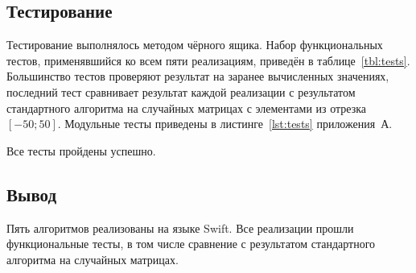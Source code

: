 \subsection{Тестирование}
Тестирование выполнялось методом чёрного ящика. Набор функциональных тестов, применявшийся ко всем пяти реализациям, приведён в таблице~\ref{tbl:tests}. Большинство тестов проверяют результат на заранее вычисленных значениях, последний тест сравнивает результат каждой реализации с результатом стандартного алгоритма на случайных матрицах с элементами из отрезка $[-50; 50]$. Модульные тесты приведены в листинге~\ref{lst:tests} приложения~А.

Все тесты пройдены успешно.

\subsection{Вывод}
Пять алгоритмов реализованы на языке Swift. Все реализации прошли функциональные тесты, в том числе сравнение с результатом стандартного алгоритма на случайных матрицах.
